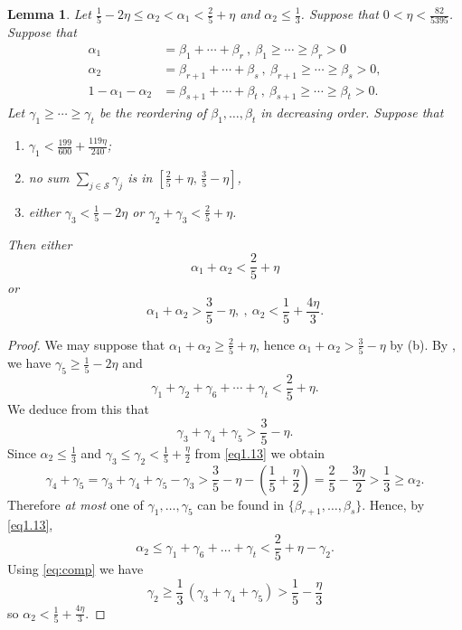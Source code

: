 \documentclass[12pt]{amsart}
\theoremstyle{plain}
\newtheorem{lem}{Lemma}
\theoremstyle{definition}
\newcommand{\mc}{\mathcal}
\numberwithin{equation}{section}
\def \a{\alpha} \def \b{\beta} \def \d{\delta} \def \e{\varepsilon} \def \g{\gamma} \def \k{\kappa} \def \l{\lambda} \def \s{\sigma} \def \t{\theta} \def \z{\zeta}
\begin{document}
 \begin{lem}\label{lem3}
   Let $\frac 15 - 2\eta \le \a_2 < \a_1 < \frac 25 + \eta$ and $\a_2 \le \frac 13$. Suppose that $0 < \eta < \frac{82}{5395}$. Suppose that
 \begin{align*}
\a_1 &= \b_1 + \cdots + \b_r \ , \ \b_1 \ge \cdots \ge \b_r > 0\\
\a_2 &= \b_{r+1} + \cdots + \b_s \ , \ \b_{r+1} \ge \cdots \ge \b_s > 0,\\
1 - \a_1-\a_2 &= \b_{s+1} + \cdots + \b_t \ , \ \b_{s+1} \ge \cdots \ge \b_t > 0. 
 \end{align*}
Let $\g_1 \ge \cdots \ge \g_t$ be the reordering of $\b_1, \ldots,\b_t$ in decreasing order. Suppose that
 \begin{enumerate}
\item[(a)] $\g_1 <\frac{199}{600}+\frac{119\eta}{240}$;

\item[(b)] no sum $\sum\limits_{j\in \mc S} \g_j$ is in $\left[\frac 25 + \eta, \, \frac 35 - \eta\right]$,

\item[(c)] either $\g_3 < \frac 15 - 2\eta$ or $\g_2 + \g_3 < \frac 25 + \eta$.
 \end{enumerate}
Then {\rm either}
 \[\a_1 + \a_2 < \frac 25 + \eta\]
{\rm or}
 \[\a_1 + \a_2 > \frac 35 - \eta, \ , \
 \a_2 < \frac 15 + \frac{4\eta}3.\]
 \end{lem}
 
 \begin{proof}
We may suppose that $\a_1 + \a_2 \ge \frac 25 + \eta$, hence $\a_1 + \a_2 > \frac 35 - \eta$ by (b). By , we have $\g_5 \ge \frac 15 - 2\eta$ and
 \begin{equation}\label{eq1.13}
\g_1 + \g_2 + \g_6 + \cdots + \g_t< \frac 2{5} + \eta. 
 \end{equation}
We deduce from this that 
\begin{equation}\label{eq:comp}
\g_3+\g_4+\g_5>\frac35-\eta.
\end{equation}
Since $\a_2 \leq \frac 13$ and $\g_3\leq \g_2 < \frac 15 + \frac \eta 2$ from \eqref{eq1.13} we obtain
 \[\g_4+\g_5=\g_3+\g_4+\g_5-\g_3 > \frac 35 - \eta - \left(
 \frac 15 + \frac \eta 2\right) = \frac 25
 - \frac {3\eta}2 > \frac 13 \geq \a_2.\]
Therefore \textit{at most} one of $\g_1, \ldots, \g_5$ can be found in $\{\b_{r+1}, \ldots, \b_s\}$. Hence, by \eqref{eq1.13}, 
 \[\a_2 \le \g_1 + \g_6 + \ldots+\g_t <
 \frac 2{5} + \eta - \g_2.\]
Using \eqref{eq:comp} we have 
 \[\g_2 \ge \frac 13\, (\g_3 + \g_4 + \g_5)
 > \frac 15 - \frac\eta 3\]
so $\a_2 < \frac 15 + \frac{4\eta}3$.
 \end{proof}
\end{document}
